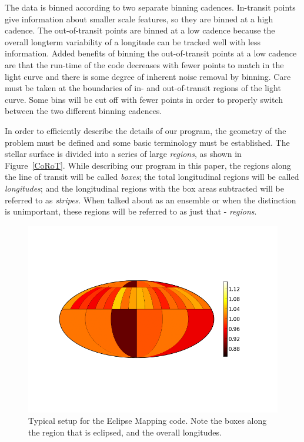 The data is binned according to two separate binning cadences. In-transit points give information about smaller scale features, so they are binned at a high cadence. The out-of-transit points are binned at a low cadence because the overall longterm variability of a longitude can be tracked well with less information. Added benefits of binning the out-of-transit points at a low cadence are that the run-time of the code decreases with fewer points to match in the light curve and there is some degree of inherent noise removal by binning. Care must be taken at the boundaries of in- and out-of-transit regions of the light curve. Some bins will be cut off with fewer points in order to properly switch between the two different binning cadences.

In order to efficiently describe the details of our program, the geometry of the problem must be defined and some basic terminology must be established. The stellar surface is divided into a series of large {\it regions}, as shown in Figure~\ref{CoRoT}. While describing our program in this paper, the regions along the line of transit will be called {\it boxes}; the total longitudinal regions will be called {\it longitudes}; and the longitudinal regions with the box areas subtracted will be referred to as {\it stripes}. When talked about as an ensemble or when the distinction is unimportant, these regions will be referred to as just that - {\it regions}.

\begin{figure}[h]
	\centering
	\includegraphics[width=.5\textwidth]{images/2b_2s/14_noise/brightness_map_w15.png}
	\caption{Typical setup for the Eclipse Mapping code. Note the boxes along the region that is eclipsed, and the overall longitudes.}
	\label{bright_map}
\end{figure}

